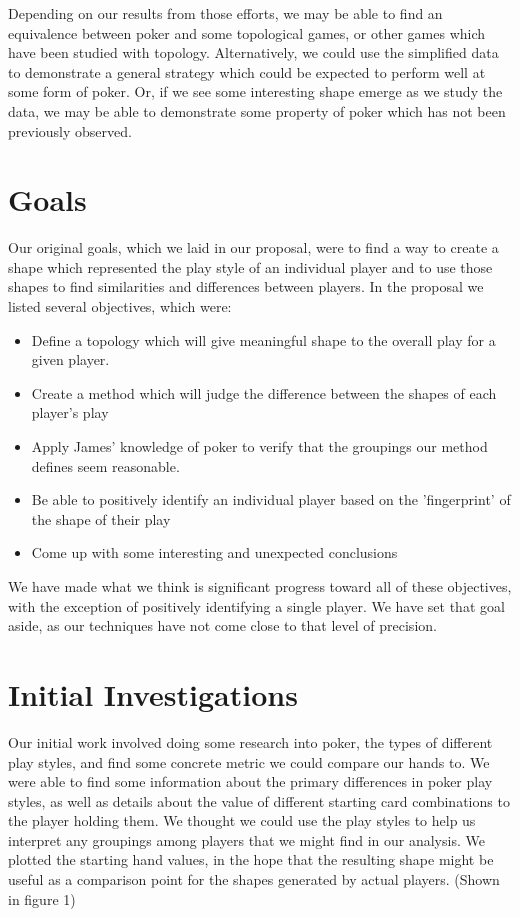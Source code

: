 \documentclass[11pt]{article}
\begin{document}
Depending on our results from those efforts, we may be able to find an equivalence
between poker and some topological games, or other games which have been
studied with topology. Alternatively, we could use the
simplified data to demonstrate a general strategy which could be expected to
perform well at some form of poker. Or, if we see some interesting shape
emerge as we study the data, we may be able to demonstrate some property of
poker which has not been previously observed.

\section*{Goals}
Our original goals, which we laid in our proposal, were to find a way to create
a shape which represented the play style of an individual player and to use those
shapes to find similarities and differences between players. In the proposal
we listed several objectives, which were:

\begin{itemize}[noitemsep]
	\item Define a topology which will give meaningful shape to the overall play
	for a given player.
	\item Create a method which will judge the difference between the shapes of
	each player's play
	\item Apply James' knowledge of poker to verify that the groupings our method
	defines seem reasonable.
	\item Be able to positively identify an individual player based on the
	'fingerprint' of the shape of their play
	\item Come up with some interesting and unexpected conclusions
\end{itemize}

We have made what we think is significant progress toward all of these
objectives, with the exception of positively identifying a single player. We have
set that goal aside, as our techniques have not come close to that level of
precision.

\section*{Initial Investigations}
Our initial work involved doing some research into poker, the types of different
play styles, and find some concrete metric we could compare our hands to.  We were
able to find some information about the primary differences in poker play styles,
as well as details about the value of different starting card combinations to the
player holding them. We thought we could use the play styles to help us interpret
any groupings among players that we might find in our analysis. We plotted the
starting hand values, in the hope that the resulting shape might be useful
as a comparison point for the shapes generated by actual players. (Shown in figure
1)
\end{document}
